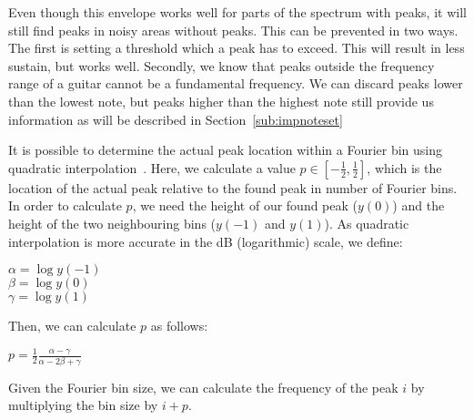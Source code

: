 \documentclass[10pt,twocolumn]{article}
\begin{document}
Even though this envelope works well for parts of the spectrum with peaks, it will still find peaks in noisy areas without peaks. This can be prevented in two ways. The first is setting a threshold which a peak has to exceed. This will result in less sustain, but works well. Secondly, we know that peaks outside the frequency range of a guitar cannot be a fundamental frequency. We can discard peaks lower than the lowest note, but peaks higher than the highest note still provide us information as will be described in Section~\ref{sub:impnoteset}

It is possible to determine the actual peak location within a Fourier bin using quadratic interpolation~\cite{interpol2}. Here, we calculate a value $p \in [-\frac{1}{2}, \frac{1}{2}]$, which is the location of the actual peak relative to the found peak in number of Fourier bins. In order to calculate $p$, we need the height of our found peak ($y(0)$) and the height of the two neighbouring bins ($y(-1)$ and $y(1)$). As quadratic interpolation is more accurate in the dB (logarithmic) scale, we define:
\begin{center}\vspace{-1mm}
    $\alpha = \log y(-1)$\\
    $\beta = \log y(0)$\\
    $\gamma = \log y(1)$
\end{center}\vspace{-1mm}
Then, we can calculate $p$ as follows:
\begin{center}\vspace{-1mm}
    $p = \frac{1}{2} \frac{\alpha - \gamma}{\alpha - 2\beta + \gamma}$
\end{center}\vspace{-1mm}
Given the Fourier bin size, we can calculate the frequency of the peak $i$ by multiplying the bin size by $i + p$.
\end{document}
